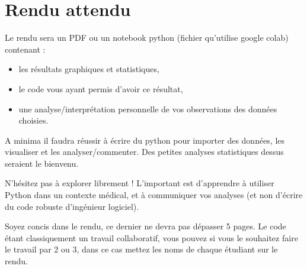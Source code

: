 \documentclass[12pt,a4paper]{article}
\begin{document}
\newpage
\section*{Rendu attendu}

Le rendu sera un PDF ou un notebook python (fichier qu'utilise google colab) contenant :
\begin{itemize}
    \item les résultats graphiques et statistiques,
    \item le code vous ayant permis d'avoir ce résultat,
    \item une analyse/interprétation personnelle de vos observations des données choisies.
\end{itemize}

A minima il faudra réussir à écrire du python pour importer des données, les visualiser et les analyser/commenter. Des petites analyses statistiques dessus seraient le bienvenu.

N'hésitez pas à explorer librement ! L'important est d'apprendre à utiliser Python dans un contexte médical, et à communiquer vos analyses (et non d'écrire du code robuste d'ingénieur logiciel).

Soyez concis dans le rendu, ce dernier ne devra pas dépasser 5 pages. Le code étant classiquement un travail collaboratif, vous pouvez si vous le souhaitez faire le travail par 2 ou 3, dans ce cas mettez les noms de chaque étudiant sur le rendu.
\end{document}

